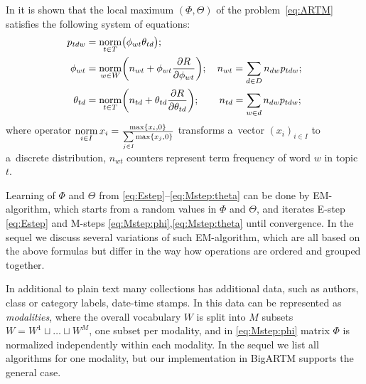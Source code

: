 \documentclass[russian,english]{llncs}
\newcommand{\norm}{\mathop{\rm norm}\limits}
\begin{document}
In \cite{voron14dan-eng} it is shown that the \mbox{local} maximum $(\Phi,\Theta)$
of the problem~\eqref{eq:ARTM} satisfies
the following system of equations:
\begin{align}
    \label{eq:Estep}
    p_{tdw} &= \norm_{t\in T} \bigl(\phi_{wt}\theta_{td}\bigr);
\\
    \label{eq:Mstep:phi}
    \phi_{wt} &= \norm_{w\in W}
        \biggl(
            n_{wt} + \phi_{wt} \frac{\partial R}{\partial \phi_{wt}}
        \biggr);
        \quad
            n_{wt} = \sum_{d\in D} n_{dw} p_{tdw};
\\
    \label{eq:Mstep:theta}
    \theta_{td} &= \norm_{t\in T}
        \biggl(
            n_{td} + \theta_{td} \frac{\partial R}{\partial \theta_{td}}
        \biggr);
        \quad\quad
            n_{td} = \sum_{w\in d} n_{dw} p_{tdw};
\end{align}
where operator
$\norm_{i \in I} x_i = \frac{\max\{x_i,0\}}{\sum\limits_{j\in I} \max\{x_j,0\}}$
transforms a~vector $(x_i)_{i \in I}$ to a~discrete distribution,
$n_{wt}$ counters represent term frequency of word $w$ in topic $t$.

Learning of $\Phi$ and $\Theta$ from \eqref{eq:Estep}--\eqref{eq:Mstep:theta} can be done by EM-algorithm,
which starts from a random values in $\Phi$ and $\Theta$, and iterates
E-step \eqref{eq:Estep} and
M-steps \eqref{eq:Mstep:phi},\eqref{eq:Mstep:theta}
until convergence.
In the sequel we discuss several variations of such EM-algorithm,
which are all based on the above formulas but differ in the way how operations are ordered and grouped together.

In additional to plain text many collections has additional data,
such as authors, class or category labels, date-time stamps.
In \cite{voron15nonbayesian} this data can be represented as \emph{modalities},
where the overall vocabulary $W$ is split into $M$ subsets
$W = W^1 \sqcup \dots \sqcup W^M$, one subset per modality,
and in \eqref{eq:Mstep:phi} matrix $\Phi$ is normalized independently 
within each modality. 
In the sequel we list all algorithms for one modality,
but our implementation in BigARTM supports the general case.
\end{document}
